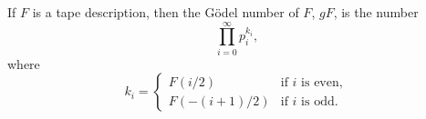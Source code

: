 If $F$ is a tape description, then the G\"{o}del number of $F$, $gF$, is the number
$$\prod_{i = 0}^{\infty} p_i^{k_i},$$
where
$$k_i = \begin{cases} F(i/2) & \text{if } i \text{ is even}, \\ F(-(i + 1)/2) & \text{if } i \text{ is odd}. \end{cases}$$
